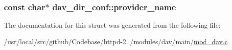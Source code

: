 \subsubsection[{\texorpdfstring{provider\+\_\+name}{provider_name}}]{\setlength{\rightskip}{0pt plus 5cm}const char$\ast$ dav\+\_\+dir\+\_\+conf\+::provider\+\_\+name}\hypertarget{structdav__dir__conf_ade134709846ce77682b73a2f7cf85e28}{}\label{structdav__dir__conf_ade134709846ce77682b73a2f7cf85e28}


The documentation for this struct was generated from the following file\+:\begin{DoxyCompactItemize}
\item 
/usr/local/src/github/\+Codebase/httpd-\/2../modules/dav/main/\hyperlink{mod__dav_8c}{mod\+\_\+dav.\+c}\end{DoxyCompactItemize}
